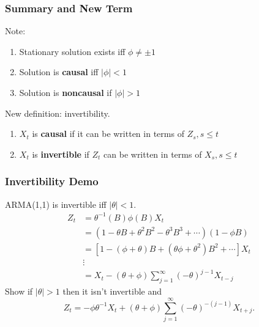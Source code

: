 \documentclass{beamer}
\begin{document}


\begin{frame}
\frametitle{Summary and New Term}

Note:
\begin{enumerate}
\item Stationary solution exists iff $\phi \neq \pm 1$
\item Solution is {\bf causal} iff $|\phi| < 1$
\item Solution is {\bf noncausal} if $|\phi|>1$
\end{enumerate}

New definition: invertibility.
\begin{enumerate}
\item $X_t$ is {\bf causal } if it can be written in terms of $Z_s, s \le t$
\item $X_t$ is {\bf invertible} if $Z_t$ can be written in terms of $X_s, s \le t$
\end{enumerate}


\end{frame}



\begin{frame}
\frametitle{Invertibility Demo}

ARMA(1,1) is invertible iff $|\theta|<1$.
\begin{align*}
Z_t &= \theta^{-1}(B)\phi(B)X_t \\
&= (1 -\theta B + \theta^2B^2 - \theta^{3}B^3 + \cdots)(1 - \phi B) \\
&= [1 - (\phi +\theta)B + (\theta\phi + \theta^2)B^2 + \cdots ] X_t \\
&\vdots\\
&= X_t - (\theta + \phi) \sum_{j=1}^{\infty} (-\theta)^{j-1}X_{t-j}
\end{align*}
Show if $|\theta|>1$ then it isn't invertible and  
\[
Z_t = -\phi \theta^{-1} X_t + (\theta + \phi) \sum_{j=1}^{\infty} (-\theta)^{-(j-1)}X_{t+j}.
\]
\end{frame}


\end{document}
